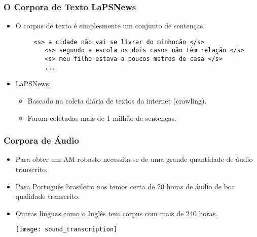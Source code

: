 \documentclass{beamer}
\begin{document}
\begin{frame}[fragile]
   \frametitle{O Corpora de Texto LaPSNews}
   \begin{itemize}
      \item O corpus de texto é simplesmente um conjunto de sentenças.
      {\footnotesize
	 \begin{verbatim}
	 <s> a cidade não vai se livrar do minhocão </s>
	    <s> segundo a escola os dois casos não têm relação </s>
	    <s> meu filho estava a poucos metros de casa </s>
	    ...
	    \end{verbatim}
      }
      \pause
      \item LaPSNews:
      \begin{itemize}
	 \item Baseado na coleta diária de textos da internet (crawling).
	 \item Foram coletadas mais de 1 milhão de sentenças.
      \end{itemize}
   \end{itemize}
\end{frame}


\begin{frame}
   \frametitle{Corpora de Áudio}
   \begin{itemize}
      \item Para obter um AM robusto necessita-se de uma grande
      quantidade de áudio transcrito.
      \item Para Português brasileiro nos temos certa de 20 horas
      de áudio de boa qualidade transcrito.
      \item Outras línguas como o Inglês tem corpus com mais de 240 horas.
      \begin{center}
	 \texttt{[image: sound\_transcription]}
      \end{center}
   \end{itemize}
\end{frame}
\end{document}
